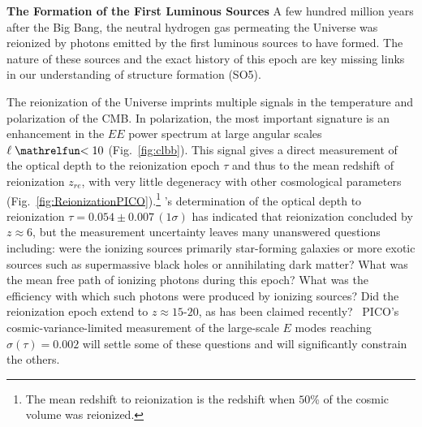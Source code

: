 \documentclass[PICOReport.tex]{subfiles}
\begin{document}

{\bf The Formation of the First Luminous Sources} \hspace{0.1in} \label{luminoussources}  
A few hundred million years after the Big Bang, the neutral hydrogen gas permeating the Universe was reionized by photons emitted by the first luminous sources to have formed.  The nature of these sources and the exact history of this epoch are key missing links in our understanding of structure formation (SO5).  
% 

The reionization of the Universe imprints multiple signals in the temperature and polarization of the CMB.  In polarization, the most important signature is an enhancement in the $EE$ power spectrum at large angular scales $\ell \simlt 10$ (Fig.~\ref{fig:clbb}). This signal gives a direct measurement of the optical depth to the reionization epoch $\tau$ and thus to the mean redshift of reionization $z_{re}$, with very little degeneracy with other cosmological parameters (Fig.~\ref{fig:ReionizationPICO}).\footnote{The mean redshift to reionization is the redshift when $50$\% of the cosmic volume was reionized.} \planck 's determination of the optical depth to reionization $\tau = 0.054 \pm 0.007\, (1\sigma) $ has indicated that reionization concluded by $z \approx 6$, but the measurement uncertainty leaves many unanswered questions including: were the ionizing sources primarily star-forming galaxies or more exotic sources such as supermassive black holes or annihilating dark matter? What was the mean free path of ionizing photons during this epoch?  What was the efficiency with which such photons were produced by ionizing sources?  
Did the reionization epoch extend to $z \approx 15$-$20$, as has been claimed recently?~\citep{Miranda2017} PICO's cosmic-variance-limited measurement of the large-scale $E$ modes reaching $\sigma(\tau)=0.002$ will settle some of these questions and will significantly constrain the others.
\end{document}
